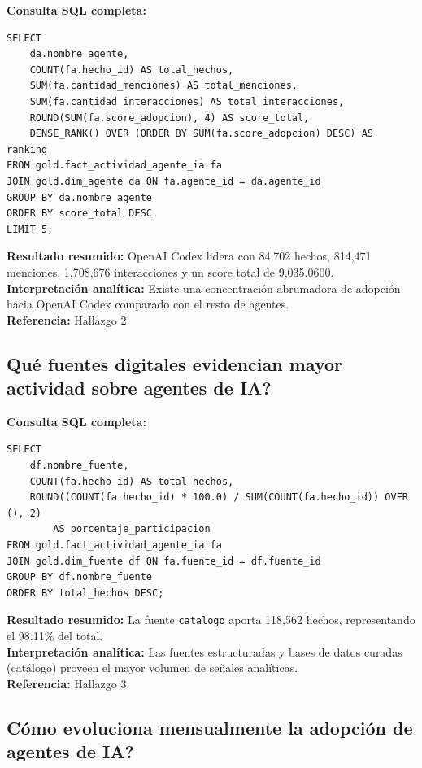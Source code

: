 \documentclass[12pt,a4paper]{article}
\begin{document}
\textbf{Consulta SQL completa:}
\begin{verbatim}
SELECT 
    da.nombre_agente,
    COUNT(fa.hecho_id) AS total_hechos,
    SUM(fa.cantidad_menciones) AS total_menciones,
    SUM(fa.cantidad_interacciones) AS total_interacciones,
    ROUND(SUM(fa.score_adopcion), 4) AS score_total,
    DENSE_RANK() OVER (ORDER BY SUM(fa.score_adopcion) DESC) AS ranking
FROM gold.fact_actividad_agente_ia fa
JOIN gold.dim_agente da ON fa.agente_id = da.agente_id
GROUP BY da.nombre_agente
ORDER BY score_total DESC
LIMIT 5;
\end{verbatim}
\textbf{Resultado resumido:} OpenAI Codex lidera con 84,702 hechos, 814,471 menciones, 1,708,676 interacciones y un score total de 9,035.0600. \\
\textbf{Interpretaci\'on anal\'itica:} Existe una concentraci\'on abrumadora de adopci\'on hacia OpenAI Codex comparado con el resto de agentes. \\
\textbf{Referencia:} Hallazgo 2.

\subsection{\textquestiondown Qu\'e fuentes digitales evidencian mayor actividad sobre agentes de IA?}

\textbf{Consulta SQL completa:}
\begin{verbatim}
SELECT 
    df.nombre_fuente,
    COUNT(fa.hecho_id) AS total_hechos,
    ROUND((COUNT(fa.hecho_id) * 100.0) / SUM(COUNT(fa.hecho_id)) OVER (), 2) 
        AS porcentaje_participacion
FROM gold.fact_actividad_agente_ia fa
JOIN gold.dim_fuente df ON fa.fuente_id = df.fuente_id
GROUP BY df.nombre_fuente
ORDER BY total_hechos DESC;
\end{verbatim}
\textbf{Resultado resumido:} La fuente \texttt{catalogo} aporta 118,562 hechos, representando el 98.11\% del total. \\
\textbf{Interpretaci\'on anal\'itica:} Las fuentes estructuradas y bases de datos curadas (cat\'alogo) proveen el mayor volumen de se\~nales anal\'iticas. \\
\textbf{Referencia:} Hallazgo 3.

\subsection{\textquestiondown C\'omo evoluciona mensualmente la adopci\'on de agentes de IA?}
\end{document}
